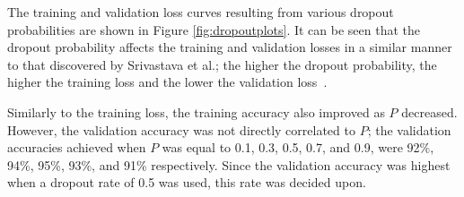 The training and validation loss curves resulting from various dropout probabilities are shown in Figure \ref{fig:dropoutplots}. It can be seen that the dropout probability affects the training and validation losses in a similar manner to that discovered by Srivastava et al.; the higher the dropout probability, the higher the training loss and the lower the validation loss~\cite{dropout}.

Similarly to the training loss, the training accuracy also improved as $P$ decreased. However, the validation accuracy was not directly correlated to $P$; the validation accuracies achieved when $P$ was equal to 0.1, 0.3, 0.5, 0.7, and 0.9, were 92\%, 94\%, 95\%, 93\%, and 91\% respectively. Since the validation accuracy was highest when a dropout rate of 0.5 was used, this rate was decided upon.

